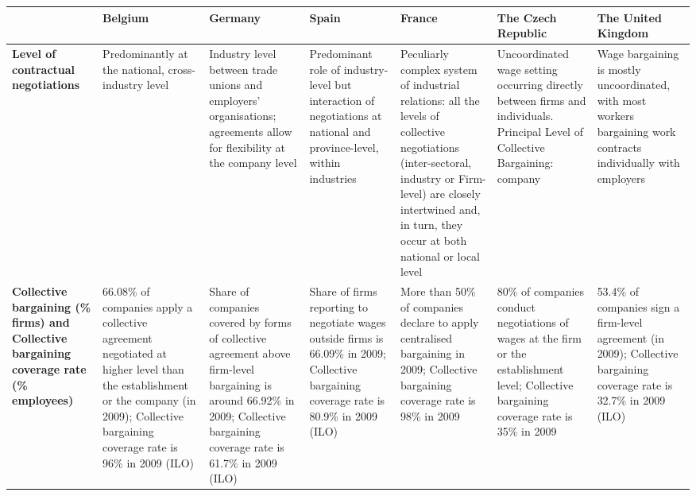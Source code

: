

  \tiny
       \begin{tabular}{p{11.22em}p{12.28em}p{12.28em}p{12.28em}p{14em}p{10em}p{12.28em}}
    \toprule
    & \textbf{Belgium} & \textbf{Germany} & \textbf{Spain} & \textbf{France} & \textbf{The Czech Republic} & \textbf{The United Kingdom} \\
    \midrule
    \textbf{Level of contractual negotiations} & Predominantly at the national, cross-industry level & Industry level between  trade unions and employers' organisations; agreements allow for flexibility at the company level & Predominant role of industry-level but interaction of negotiations at national and province-level, within industries & Peculiarly complex system of industrial relations:  all the levels of collective negotiations (inter-sectoral, industry or Firm-level) are closely intertwined and, in turn, they occur at both national or local level & Uncoordinated wage setting occurring directly between  firms and individuals. Principal Level of Collective Bargaining: company & Wage bargaining is mostly uncoordinated, with most workers bargaining work contracts individually with employers \\
    \midrule
    \textbf{Collective bargaining (\% firms) and Collective bargaining coverage rate (\% employees) } & 66.08\% of companies apply a collective agreement negotiated at higher level than the establishment or the company (in 2009); Collective bargaining coverage rate is 96\% in 2009 (ILO) &  Share of companies covered by forms of collective agreement above firm-level bargaining is around 66.92\% in 2009; Collective bargaining coverage rate is 61.7\% in 2009 (ILO) & Share of firms reporting to negotiate wages outside firms is 66.09\% in 2009; Collective bargaining coverage rate is 80.9\% in 2009 (ILO) & More than 50\% of companies declare to apply centralised bargaining in 2009; Collective bargaining coverage rate is 98\% in 2009 & 80\% of companies  conduct negotiations of wages at the firm or the establishment level; Collective bargaining coverage rate is 35\% in 2009 & 53.4\% of companies sign a firm-level agreement (in 2009); Collective bargaining coverage rate is 32.7\% in 2009 (ILO) \\
    \midrule

\end{tabular}

